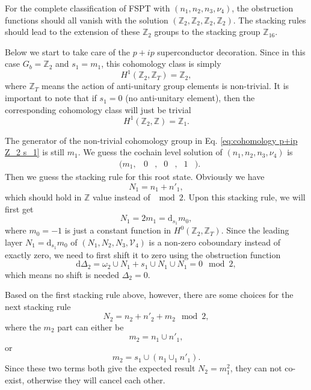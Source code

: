 \documentclass[%
 reprint,
 amsmath,amssymb,
 aps,
prb,
]{revtex4-2}
\begin{document}
For the complete classification of FSPT with $(n_1, n_2, n_3, \nu_4)$, the obstruction functions should all vanish with the solution $(\mathbb Z_2, \mathbb Z_2, \mathbb Z_2, \mathbb Z_2)$.
The stacking rules should lead to the extension of these $\mathbb Z_2$ groups to the stacking group $\mathbb Z_{16}$.

Below we start to take care of the $p+ip$ superconductor decoration.
Since in this case $G_b = \mathbb Z_2$ and $s_1 = m_1$, this cohomology class is simply 
\begin{equation}
H^1(\mathbb Z_2, \mathbb Z_T) = \mathbb Z_2 \label{eq:cohomology p+ip Z_2 s_1},
\end{equation}
where $\mathbb Z_T$ means the action of anti-unitary group elements is non-trivial.
It is important to note that if $s_1 = 0$ (no anti-unitary element), then the corresponding cohomology class will just be trivial
\begin{equation}
H^1(\mathbb Z_2, \mathbb Z) = \mathbb Z_1 . 
\end{equation}

The generator of the non-trivial cohomology group in Eq. \eqref{eq:cohomology p+ip Z_2 s_1} is still $m_1$.
We guess the cochain level solution of $(n_1, n_2, n_3, \nu_4)$ is 
\begin{align}
&(m_1 ,& 0 &, & 0 &, & 1 &) .
\end{align}
Then we guess the stacking rule for this root state.
Obviously we have 
\begin{equation}
N_1 = n_1 + n'_1 ,
\end{equation}
which should hold in $\mathbb Z$ value instead of $\mod 2$.
Upon this stacking rule, we will first get 
\begin{equation}
N_1 = 2m_1 = \mathrm{d} _{s_1} m_0 ,
\end{equation}
where $m_0 = -1$ is just a constant function in $H^0(\mathbb Z_2, \mathbb Z_T)$.
Since the leading layer $N_1 = \mathrm{d} _{s_1} m_0$ of $(N_1, N_2, N_3, \mathcal{V} _4)$ is a non-zero coboundary instead of exactly zero, we need to first shift it to zero using the obstruction function
\begin{equation}
\mathrm{d} \Delta_{2} =\omega _{2} \cup N_{1} +s_{1} \cup N_{1} \cup N_{1} = 0 \mod 2,
\end{equation}
which means no shift is needed $\Delta _2 = 0$.

Based on the first stacking rule above, however, there are some choices for the next stacking rule  
\begin{equation}
N_2 = n_2 + n'_2 + m_2 \mod 2,
\end{equation}
where the $m_2$ part can either be 
\begin{equation}
m_2 = n_1 \cup n'_1 ,
\end{equation}
or 
\begin{equation}
m_2 = s_1 \cup (n_1 \cup_1 n'_1)  \label{eq:stacking p+ip} .
\end{equation}
Since these two terms both give the expected result $N_2 = m^2_1$, they can not co-exist, otherwise they will cancel each other.
\end{document}
